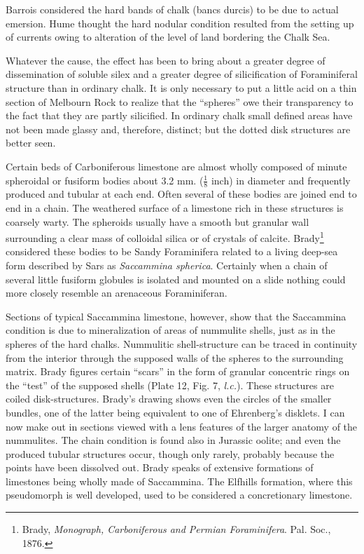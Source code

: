 \documentclass[a4paper, 12pt, oneside]{article}
\begin{document}
Barrois considered the hard bands of chalk (bancs durcis) to be due to actual emersion. Hume thought the hard nodular condition resulted from the setting up of currents owing to alteration of the level of land bordering the Chalk Sea.

Whatever the cause, the effect has been to bring about a greater degree of dissemination of soluble silex and a greater degree of silicification of Foraminiferal structure than in ordinary chalk. It is only necessary to put a little acid on a thin section of Melbourn Rock to realize that the ``spheres'' owe their transparency to the fact that they are partly silicified. In ordinary chalk small defined areas have not been made glassy and, therefore, distinct; but the dotted disk structures are better seen.

Certain beds of Carboniferous limestone are almost wholly composed of minute spheroidal or fusiform bodies about 3.2 mm. ($\frac{1}{8}$ inch) in diameter and frequently produced and tubular at each end. Often several of these bodies are joined end to end in a chain. The weathered surface of a limestone rich in these structures is coarsely warty. The spheroids usually have a smooth but granular wall surrounding a clear mass of colloidal silica or of crystals of calcite. Brady\footnote{Brady, \emph{Monograph, Carboniferous and Permian Foraminifera}. Pal. Soc., 1876.} considered these bodies to be Sandy Foraminifera related to a living deep-sea form described by Sars as \emph{Saccammina spherica}. Certainly when a chain of several little fusiform globules is isolated and mounted on a slide nothing could more closely resemble an arenaceous Foraminiferan.

Sections of typical Saccammina limestone, however, show that the Saccammina condition is due to mineralization of areas of nummulite shells, just as in the spheres of the hard chalks. Nummulitic shell-structure can be traced in continuity from the interior through the supposed walls of the spheres to the surrounding matrix. Brady figures certain ``scars'' in the form of granular concentric rings on the ``test'' of the supposed shells (Plate 12, Fig. 7, \emph{l.c.}). These structures are coiled disk-structures. Brady's drawing shows even the circles of the smaller bundles, one of the latter being equivalent to one of Ehrenberg's disklets. I can now make out in sections viewed with a lens features of the larger anatomy of the nummulites. The chain condition is found also in Jurassic oolite; and even the produced tubular structures occur, though only rarely, probably because the points have been dissolved out. Brady speaks of extensive formations of limestones being wholly made of Saccammina. The Elfhills formation, where this pseudomorph is well developed, used to be considered a concretionary limestone.
\end{document}
